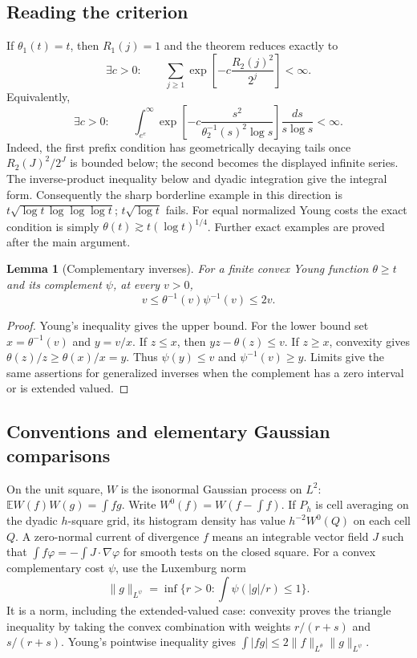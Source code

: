 \documentclass[11pt]{article}
\newtheorem{lemma}[theorem]{Lemma}
\newcommand{\E}{\mathbb E}
\numberwithin{equation}{section}
\begin{document}
\subsection{Reading the criterion}
If $\theta_1(t)=t$, then $R_1(j)=1$ and the theorem reduces exactly to
\[
 \exists c>0:\qquad
 \sum_{j\ge1}\exp\left[-c\frac{R_2(j)^2}{2^j}\right]<\infty.
\]
Equivalently,
\[
 \exists c>0:\qquad
 \int_{e^e}^{\infty}
 \exp\left[-c\frac{s^2}{\theta_2^{-1}(s)^2\log s}\right]
 \frac{ds}{s\log s}<\infty.
\]
Indeed, the first prefix condition has geometrically decaying tails once
$R_2(J)^2/2^J$ is bounded below; the second becomes the displayed
infinite series. The inverse-product inequality below and dyadic
integration give the integral form.
Consequently the sharp borderline example in this direction is
$t\sqrt{\log t\,\log\log\log t}$; $t\sqrt{\log t}$ fails.
For equal normalized Young costs the exact condition is simply
$\theta(t)\gtrsim t(\log t)^{1/4}$.
Further exact examples are proved after the main argument.

\begin{lemma}[Complementary inverses]\label{pair:lem:inverse-product}
For a finite convex Young function $\theta\ge t$ and its complement
$\psi$, at every $v>0$,
\[
 v\le\theta^{-1}(v)\psi^{-1}(v)\le2v.
\]
\end{lemma}
\begin{proof}
Young's inequality gives the upper bound. For the lower bound set
$x=\theta^{-1}(v)$ and $y=v/x$. If $z\le x$, then
$yz-\theta(z)\le v$. If $z\ge x$, convexity gives
$\theta(z)/z\ge\theta(x)/x=y$. Thus $\psi(y)\le v$ and
$\psi^{-1}(v)\ge y$. Limits give the same assertions for generalized
inverses when the complement has a zero interval or is extended valued.
\end{proof}


\subsection{Conventions and elementary Gaussian comparisons}
On the unit square, $W$ is the isonormal Gaussian process on $L^2$:
$\E W(f)W(g)=\int fg$. Write
$W^0(f)=W(f-\int f)$. If $P_h$ is cell averaging on the dyadic
$h$-square grid, its histogram density has value $h^{-2}W^0(Q)$ on
each cell $Q$. A zero-normal current of divergence $f$ means an
integrable vector field $J$ such that
$\int f\varphi=-\int J\cdot\nabla\varphi$ for smooth tests on the
closed square. For a convex complementary cost $\psi$, use the
Luxemburg norm
\[
 \|g\|_{L^\psi}=\inf\{r>0:\int\psi(|g|/r)\le1\}.
\]
It is a norm, including the extended-valued case: convexity proves
the triangle inequality by taking the convex combination with weights
$r/(r+s)$ and $s/(r+s)$. Young's pointwise inequality gives
$\int|fg|\le2\|f\|_{L^\theta}\|g\|_{L^\psi}$.
\end{document}

